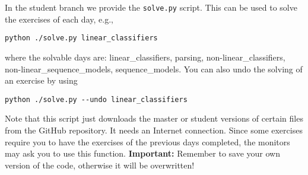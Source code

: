 In the student branch we provide the \verb+solve.py+ script. This can be used
to solve the exercises of each day, e.g.,

\begin{verbatim}
python ./solve.py linear_classifiers
\end{verbatim}

\noindent where the solvable days are: linear\_classifiers, parsing, non-linear\_classifiers, non-linear\_sequence\_models, sequence\_models. You can also undo the solving of an exercise by using

\begin{verbatim}
python ./solve.py --undo linear_classifiers
\end{verbatim}

Note that this script just downloads the master or student versions of certain files from the GitHub repository. It needs an Internet connection. Since some exercises require you to have the exercises of the previous days completed, the monitors may ask you to use this function. \textbf{Important:} Remember to save your own version of the code, otherwise it will be overwritten!
